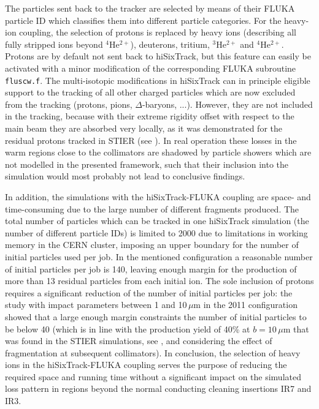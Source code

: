 The particles sent back to the tracker are selected by means of their FLUKA particle ID which classifies them into different particle categories. For the heavy-ion coupling, the selection of protons is replaced by heavy ions (describing all fully stripped ions beyond $^{4}$He$^{2+}$), deuterons, tritium, $^{3}$He$^{2+}$ and $^{4}$He$^{2+}$. Protons are by default not sent back to hiSixTrack, but this feature can easily be activated with a minor modification of the corresponding FLUKA subroutine \texttt{fluscw.f}. The multi-isotopic modifications in hiSixTrack can in principle eligible support to the tracking of all other charged particles which are now excluded from the tracking (protons, pions, $\Delta$-baryons, ...). However, they are not included in the tracking, because with their extreme rigidity offset with respect to the main beam they are absorbed very locally, as it was demonstrated for the residual protons tracked in STIER (see ). In real operation these losses in the warm regions close to the collimators are shadowed by particle showers which are not modelled in the presented framework, such that their inclusion into the simulation would most probably not lead to conclusive findings. 

In addition, the simulations with the hiSixTrack-FLUKA coupling are space- and time-consuming due to the large number of different fragments produced. The total number of particles which can be tracked in one hiSixTrack simulation (the number of different particle IDs) is limited to 2000 due to limitations in working memory in the CERN cluster, imposing an upper boundary for the number of initial particles used per job. In the mentioned configuration a reasonable number of initial particles per job is 140, leaving enough margin for the production of more than 13 residual particles from each initial \lead ion. The sole inclusion of protons requires a significant reduction of the number of initial particles per job: the study with impact parameters between 1 and 10$\,\mu$m in the 2011 configuration showed that a large enough margin constraints the number of initial particles to be below 40 (which is in line with the production yield of 40\% at $b=10\,\mu$m that was found in the STIER simulations, see , and considering the effect of fragmentation at subsequent collimators). In conclusion, the selection of heavy ions in the hiSixTrack-FLUKA coupling serves the purpose of reducing the required space and running time without a significant impact on the simulated loss pattern in regions beyond the normal conducting cleaning insertions IR7 and IR3. 

